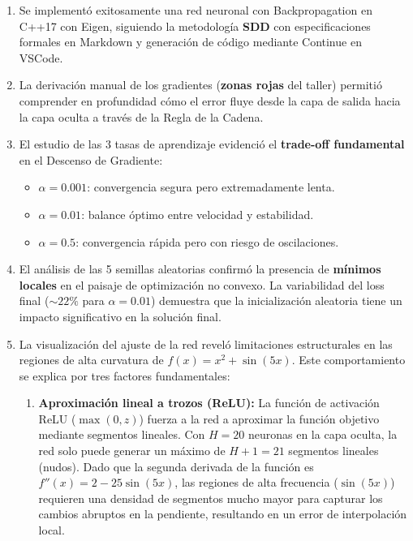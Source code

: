 \documentclass[12pt,a4paper]{article}
\theoremstyle{definition}
\begin{document}
\begin{enumerate}
    \item Se implement\'{o} exitosamente una red neuronal con Backpropagation en C++17 con Eigen, siguiendo la metodolog\'{i}a \textbf{SDD} con especificaciones formales en Markdown y generaci\'{o}n de c\'{o}digo mediante Continue en VSCode.
    
    \item La derivaci\'{o}n manual de los gradientes (\textbf{zonas rojas} del taller) permiti\'{o} comprender en profundidad c\'{o}mo el error fluye desde la capa de salida hacia la capa oculta a trav\'{e}s de la Regla de la Cadena.
    
    \item El estudio de las 3 tasas de aprendizaje evidenci\'{o} el \textbf{trade-off fundamental} en el Descenso de Gradiente:
    \begin{itemize}
        \item $\alpha = 0.001$: convergencia segura pero extremadamente lenta.
        \item $\alpha = 0.01$: balance \'optimo entre velocidad y estabilidad.
        \item $\alpha = 0.5$: convergencia r\'{a}pida pero con riesgo de oscilaciones.
    \end{itemize}
    
    \item El an\'{a}lisis de las 5 semillas aleatorias confirm\'{o} la presencia de \textbf{m\'{i}nimos locales} en el paisaje de optimizaci\'{o}n no convexo. La variabilidad del loss final ($\sim 22\%$ para $\alpha = 0.01$) demuestra que la inicializaci\'{o}n aleatoria tiene un impacto significativo en la soluci\'{o}n final.
    
   \item La visualización del ajuste de la red reveló limitaciones estructurales en las regiones de alta curvatura de $f(x) = x^2 + \sin(5x)$. Este comportamiento se explica por tres factores fundamentales:
\begin{enumerate}
    \item \textbf{Aproximación lineal a trozos (ReLU):} La función de activación ReLU ($\max(0, z)$) fuerza a la red a aproximar la función objetivo mediante segmentos lineales. Con $H = 20$ neuronas en la capa oculta, la red solo puede generar un máximo de $H+1 = 21$ segmentos lineales (nudos). Dado que la segunda derivada de la función es $f''(x) = 2 - 25\sin(5x)$, las regiones de alta frecuencia ($\sin(5x)$) requieren una densidad de segmentos mucho mayor para capturar los cambios abruptos en la pendiente, resultando en un error de interpolación local.
    

\end{enumerate}
\end{enumerate}
\end{document}
